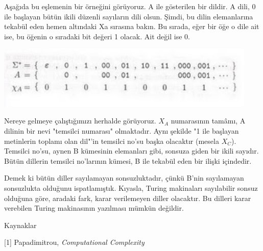 \documentclass[12pt,fleqn]{article}\usepackage{../../common}
\begin{document}
Aşağıda bu eşlemenin bir örneğini görüyoruz. A ile gösterilen bir dildir. A
dili, 0 ile başlayan bütün ikili düzenli sayıların dili olsun. Şimdi, bu
dilin elemanlarına tekabül eden hemen altındaki Xa sırasına bakın. Bu
sırada, eğer bir öğe o dile ait ise, bu öğenin o sıradaki bit değeri 1
olacak. Ait değil ise 0.

\includegraphics[height=3cm]{infinite_binary_esleme.png}

Nereye gelmeye çalıştığımızı herhalde görüyoruz. $X_A$ numarasının tamâmı,
A dilinin bir nevi "temsilci numarası" olmaktadır. Aynı şekilde "1 ile
başlayan metinlerin toplamı olan dil"'in temsilci no'su başka olacaktır
(mesela $X_C$). Temsilci no'su, aynen B kümesinin elemanları gibi, sonsuza
giden bir ikili sayıdır. Bütün dillerin temsilci no'larının kümesi, B ile
tekabül eden bir ilişki içindedir.

Demek ki bütün diller sayılamayan sonsuzluktadır, çünkü B'nin sayılamayan
sonsuzlukta olduğunu ispatlamıştık. Kıyasla, Turing makinaları sayılabilir
sonsuz olduğuna göre, aradaki fark, karar verilemeyen diller olacaktır. Bu
dilleri karar verebilen Turing makinasının yazılması mümkün değildir.

Kaynaklar 

[1] Papadimitrou, {\em Computational Complexity}
\end{document}
